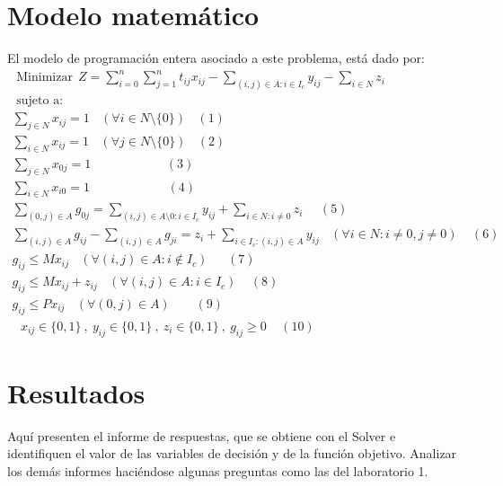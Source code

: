 \documentclass[11pt,addpoints]{article}
\begin{document}
\section{Modelo matemático}
El modelo de programación entera asociado a este problema, está dado por:\\
\begin{gather*}
    \text{ Minimizar}\ \ Z = \sum_{i=0}^{n} \sum_{j=1}^{n} t_{ij}x_{ij} - \sum_{(i,j)\in A : i \in I_c } y_{ij} - \sum_{i \in N} z_i\\
    \text{ sujeto a:}\\
     \sum_{j \in N} x_{ij}=1 \ \ \ \ (\forall i \in N\setminus\{0\}) \ \ \ \ (1)\\
    \sum_{i \in N} x_{ij} = 1 \ \ \ \ (\forall j \in N\setminus\{0\}) \ \ \ \ (2) \\
     \sum_{j \in N} x_{0j} = 1 \ \ \ \ \ \ \ \  \ \ \ \   \ \ \ \  \ \ \ \  \ \ \ \ \ \ \ (3) \\
    \sum_{i \in N} x_{i0} = 1 \ \ \ \ \ \ \ \  \ \ \ \   \ \ \ \  \ \ \ \  \ \ \ \ \ \ \ \ (4) \\
     \sum_{(0,j) \in A} g_{0j} = \sum_{(i,j)\in A\setminus{0}:i \in I_{c}} y_{ij} + \sum_{i \in N: i \neq 0} z_i \ \ \ \ \ \ (5) \\
     \sum_{(i,j) \in A} g_{ij} - \sum_{(i,j) \in A} g_{ji} = z_i + \sum_{i \in I_c :(i,j)\in A} y_{ij} \ \ \ \  (\forall i \in N: i\neq0, j\neq0) \ \ \ \ \ (6) \\
     g_{ij} \leq Mx_{ij} \ \ \ \ (\forall (i,j) \in A: i \notin I_c) \ \ \ \ \ \ \ (7)\\
     g_{ij} \leq Mx_{ij} + z_{ij} \ \ \ \ (\forall (i,j) \in A: i \in I_c) \ \ \ \ \ (8)\\
     g_{ij} \leq Px_{ij} \ \ \ \ (\forall (0,j) \in A) \ \ \ \ \ \ \ \ \ (9)\\
    \text{\ \ \ \ } x_{ij} \in \{0,1\} \ , \ y_{ij} \in \{0,1\} \ , \ z_i \in \{0,1\} \ , \ g_{ij} \geq 0 \ \ \ \ \ (10)
\end{gather*}
\section{Resultados}
Aquí presenten el informe de respuestas, que se obtiene con el Solver e identifiquen el valor de las variables de decisión y de la función objetivo. Analizar los demás informes haciéndose algunas preguntas como las del laboratorio 1.
\end{document}

